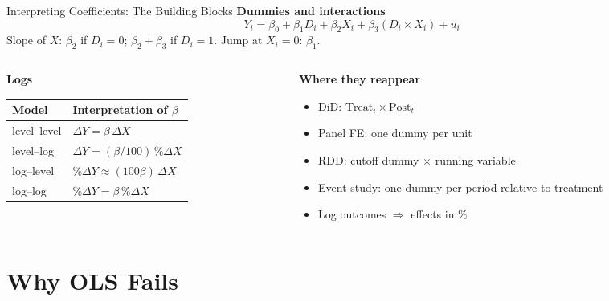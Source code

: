 \documentclass[9pt,aspectratio=169]{beamer}
\begin{document}
\begin{frame}{Interpreting Coefficients: The Building Blocks}
\linespread{1.2}\selectfont
  \textbf{Dummies and interactions}
  \[
    Y_i = \beta_0 + \beta_1 D_i + \beta_2 X_i + \beta_3 (D_i\times X_i) + u_i
  \]
  Slope of $X$: $\beta_2$ if $D_i=0$; $\beta_2+\beta_3$ if $D_i=1$. Jump at $X_i=0$: $\beta_1$.
  \medskip

  \begin{columns}[T]
    \begin{column}{0.48\textwidth}
      \textbf{Logs}\\[2pt]
      \begin{tabular}{@{}ll@{}}
        \toprule
        Model & Interpretation of $\beta$ \\
        \midrule
        level--level & $\Delta Y=\beta\,\Delta X$ \\
        level--log & $\Delta Y=(\beta/100)\,\%\Delta X$ \\
        log--level & $\%\Delta Y\approx(100\beta)\,\Delta X$ \\
        log--log & $\%\Delta Y=\beta\,\%\Delta X$ \\
        \bottomrule
      \end{tabular}
    \end{column}
    \begin{column}{0.48\textwidth}
      \textbf{Where they reappear}\\[2pt]
      \begin{itemize}
        \item DiD: $\text{Treat}_i\times\text{Post}_t$
        \item Panel FE: one dummy per unit
        \item RDD: cutoff dummy $\times$ running variable
        \item Event study: one dummy per period relative to treatment
        \item Log outcomes $\Rightarrow$ effects in \%
      \end{itemize}
    \end{column}
  \end{columns}
\end{frame}

\section{Why OLS Fails}
\end{document}
